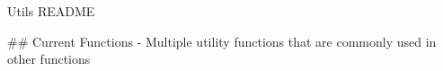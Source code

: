 Utils README


## Current Functions
- Multiple utility functions that are commonly used in other functions
